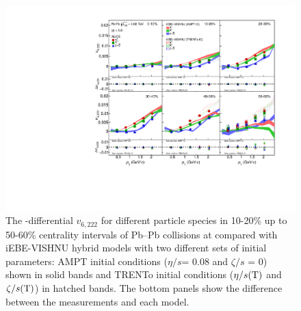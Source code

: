 \begin{figure}[!htb]
\begin{center}
\includegraphics[scale=0.73]{figures/model/TrentoAndAMPT_v6222_gap00_PID2.pdf}
\end{center}
\caption{The \pT-differential $v_{6,222}$ for different particle species in 10-20\% up to 50-60\% centrality intervals of Pb--Pb collisions at \sNN compared with iEBE-VISHNU hybrid models with two different sets of initial parameters: AMPT initial conditions ($\eta/s$= 0.08 and $\zeta/s$ = 0) shown in solid bands and TRENTo initial conditions ($\eta/s({\rm T})$ and $\zeta/s({\rm T})$) in hatched bands. The bottom panels show the difference between the measurements and each model.}
\label{v6222_model}
\end{figure}



\newpage